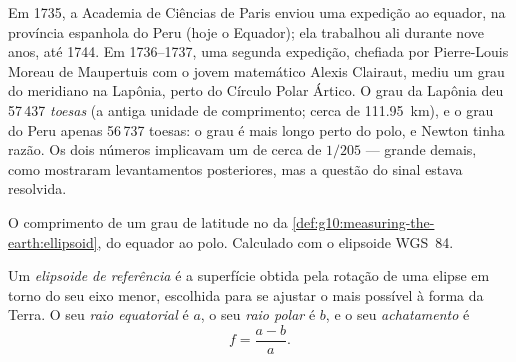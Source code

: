 \begin{history}
Em 1735, a Academia de Ciências de Paris enviou uma expedição ao equador, na
província espanhola do Peru (hoje o Equador); ela trabalhou ali durante nove
anos, até 1744. Em 1736--1737, uma segunda expedição, chefiada por
Pierre-Louis Moreau de Maupertuis com o jovem matemático Alexis Clairaut,
mediu um grau do meridiano na Lapônia, perto do Círculo Polar Ártico. O
grau da Lapônia deu 57\,437 \emph{toesas} (a antiga unidade de comprimento;
cerca de \qty{111.95}{km}), e o grau do Peru apenas 56\,737 toesas: o grau
é mais longo perto do polo, e Newton tinha razão. Os dois números
implicavam um  de cerca de $1/205$ --- grande demais, como
mostraram levantamentos posteriores, mas a questão do sinal estava
resolvida.
\end{history}

\begin{omfigure}

{\small O comprimento de um grau de latitude no  da
\cref{def:g10:measuring-the-earth:ellipsoid}, do equador ao polo. Calculado
com o elipsoide WGS~84.}
\end{omfigure}

\begin{definition}\label{def:g10:measuring-the-earth:ellipsoid}
Um \emph{elipsoide de referência}
é a superfície obtida pela rotação de uma elipse em torno do seu eixo
menor, escolhida para se ajustar o mais possível à forma da Terra. O seu
\emph{raio equatorial} é $a$, o seu \emph{raio polar} é $b$, e o seu
\emph{achatamento} é
\[
  f = \frac{a-b}{a}.
\]
\end{definition}

